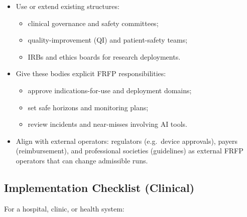 \begin{itemize}
  \item Use or extend existing structures:
        \begin{itemize}
          \item clinical governance and safety committees;
          \item quality-improvement (QI) and patient-safety teams;
          \item IRBs and ethics boards for research deployments.
        \end{itemize}
  \item Give these bodies explicit FRFP responsibilities:
        \begin{itemize}
          \item approve indications-for-use and deployment domains;
          \item set safe horizons and monitoring plans;
          \item review incidents and near-misses involving AI tools.
        \end{itemize}
  \item Align with external operators:
        regulators (e.g.\ device approvals), payers (reimbursement), and
        professional societies (guidelines) as external FRFP operators
        that can change admissible runs.
\end{itemize}

\subsection{Implementation Checklist (Clinical)}

For a hospital, clinic, or health system:

